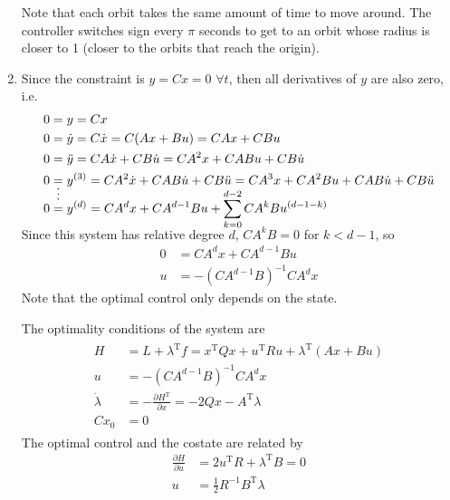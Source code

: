 \documentclass[letterpaper,11pt,titlepage]{article}
\newcommand{\trans}{^\text{T}}
\newcommand*\pder[2]{\frac{\partial #1}{\partial #2}}
\begin{document}
\begin{enumerate}[leftmargin=0pt]
\begin{center}
        \end{center}
        Note that each orbit takes the same amount of time to move around. The controller switches sign every $\pi$ seconds to get to an orbit whose radius is closer to 1 (closer to the orbits that reach the origin).

    \item Since the constraint is $y=Cx=0$ $\forall t$, then all derivatives of $y$ are also zero, i.e.
        \begin{align}
            0 &= y = Cx \\
            0 &= \dot y = C\dot x = C(Ax + Bu) = CAx + CBu \\
            0 &= \ddot y = CA \dot x + CB\dot u = CA^2 x + CABu + CB\dot u \\
            0 &= y^{(3)} = CA^2 \dot x + CAB\dot u + CB\ddot u = CA^3 x + CA^2Bu + CAB\dot u + CB\ddot u \\
              & \shortvdotswithin{=}
            0 &= y^{(d)} = CA^d x + CA^{d-1}Bu + \smash{\sum_{k=0}^{d-2}} \, CA^kB u^{(d-1-k)}
        \end{align}
        Since this system has relative degree $d$, $CA^kB=0$ for $k<d-1$, so
        \begin{align}
            0 &= CA^d x + CA^{d-1}B u \\
            u &= -(CA^{d-1}B)^{-1} CA^d x
        \end{align}
        Note that the optimal control only depends on the state.

        The optimality conditions of the system are
        \begin{gather}
            \boxed{
            \begin{aligned}
                H &= L + \lambda\trans f = x\trans Q x + u\trans R u + \lambda\trans(Ax + Bu) \\
                u &= -(CA^{d-1}B)^{-1} CA^d x \\
                \dot\lambda &= -\pder{H\trans}{x} = -2Qx - A\trans\lambda \\
                Cx_0 &= 0
            \end{aligned}
            }
        \end{gather}
        The optimal control and the costate are related by
        \begin{align}
            \pder{H}{u} &= 2u\trans R + \lambda\trans B = 0 \\
            u &= \frac{1}{2} R^{-1} B\trans \lambda
        \end{align}

\end{enumerate}
\end{document}
